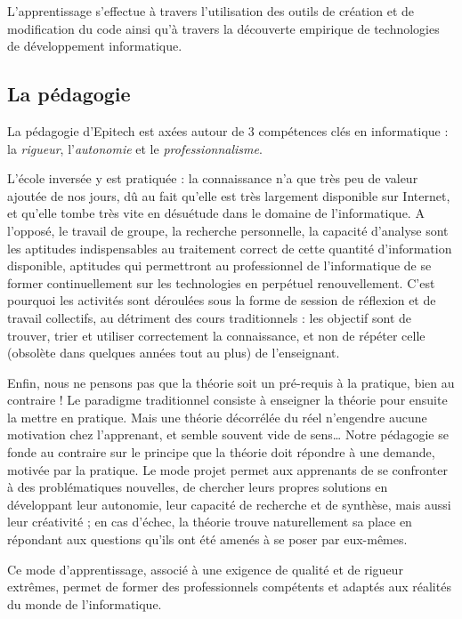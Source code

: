 \documentclass
	[a4paper,
	 11pt     ,
	 babel-en ;
	]
{article}
\begin{document}
L'apprentissage s'effectue à travers l'utilisation des outils de
création et de modification du code ainsi qu'à travers la découverte
empirique de technologies de développement informatique.

\hypertarget{la-puxe9dagogie}{%
\subsection{La pédagogie}\label{la-puxe9dagogie}}

La pédagogie d'Epitech est axées autour de 3 compétences clés en
informatique : la \emph{rigueur}, l'\emph{autonomie} et le
\emph{professionnalisme}.

L'école inversée y est pratiquée : la connaissance n'a que très peu de
valeur ajoutée de nos jours, dû au fait qu'elle est très largement
disponible sur Internet, et qu'elle tombe très vite en désuétude dans le
domaine de l'informatique. A l'opposé, le travail de groupe, la
recherche personnelle, la capacité d'analyse sont les aptitudes
indispensables au traitement correct de cette quantité d'information
disponible, aptitudes qui permettront au professionnel de l'informatique
de se former continuellement sur les technologies en perpétuel
renouvellement. C'est pourquoi les activités sont déroulées sous la
forme de session de réflexion et de travail collectifs, au détriment des
cours traditionnels : les objectif sont de trouver, trier et utiliser
correctement la connaissance, et non de répéter celle (obsolète dans
quelques années tout au plus) de l'enseignant.

Enfin, nous ne pensons pas que la théorie soit un pré-requis à la
pratique, bien au contraire ! Le paradigme traditionnel consiste à
enseigner la théorie pour ensuite la mettre en pratique. Mais une
théorie décorrélée du réel n'engendre aucune motivation chez
l'apprenant, et semble souvent vide de sens\ldots{} Notre pédagogie se
fonde au contraire sur le principe que la théorie doit répondre à une
demande, motivée par la pratique. Le mode projet permet aux apprenants
de se confronter à des problématiques nouvelles, de chercher leurs
propres solutions en développant leur autonomie, leur capacité de
recherche et de synthèse, mais aussi leur créativité ; en cas d'échec,
la théorie trouve naturellement sa place en répondant aux questions
qu'ils ont été amenés à se poser par eux-mêmes.

Ce mode d'apprentissage, associé à une exigence de qualité et de rigueur
extrêmes, permet de former des professionnels compétents et adaptés aux
réalités du monde de l'informatique.
\end{document}
